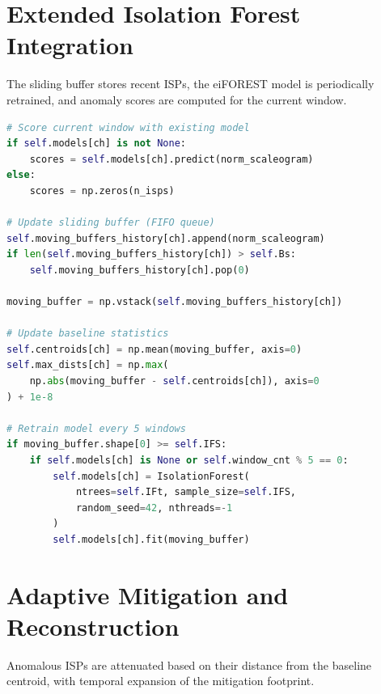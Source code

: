 \documentclass[MScCS,12pt,oneside,final]{uccthesis}
\begin{document}
\section{Extended Isolation Forest Integration}
\label{app:code_eiforest}

The sliding buffer stores recent ISPs, the eiFOREST model is periodically retrained, and anomaly scores are computed for the current window.

\begin{lstlisting}[language=Python, caption={Adaptive buffer management and anomaly detection}, label={lst:eiforest}]
# Score current window with existing model
if self.models[ch] is not None:
    scores = self.models[ch].predict(norm_scaleogram)
else:
    scores = np.zeros(n_isps)

# Update sliding buffer (FIFO queue)
self.moving_buffers_history[ch].append(norm_scaleogram)
if len(self.moving_buffers_history[ch]) > self.Bs:
    self.moving_buffers_history[ch].pop(0)

moving_buffer = np.vstack(self.moving_buffers_history[ch])

# Update baseline statistics
self.centroids[ch] = np.mean(moving_buffer, axis=0)
self.max_dists[ch] = np.max(
    np.abs(moving_buffer - self.centroids[ch]), axis=0
) + 1e-8

# Retrain model every 5 windows
if moving_buffer.shape[0] >= self.IFS:
    if self.models[ch] is None or self.window_cnt % 5 == 0:
        self.models[ch] = IsolationForest(
            ntrees=self.IFt, sample_size=self.IFS, 
            random_seed=42, nthreads=-1
        )
        self.models[ch].fit(moving_buffer)
\end{lstlisting}

\section{Adaptive Mitigation and Reconstruction}
\label{app:code_mitigation}

Anomalous ISPs are attenuated based on their distance from the baseline centroid, with temporal expansion of the mitigation footprint.
\end{document}
